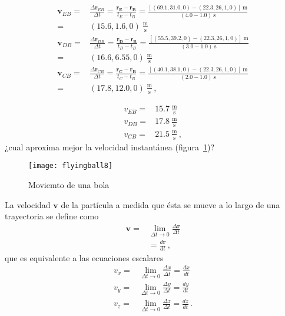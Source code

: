 \begin{align}
  \mathbf{v}_{EB}=&\frac{\Delta \mathbf{r}_{EB}}{\Delta t}
=\frac{\mathbf{\mathbf{r}_E-\mathbf{r}_B}}{t_E-t_B}=
\frac{[(69.1,31.0,0)-(22.3,26,1,0)]\ \text{m}}{(4.0-1.0)\ \text{s}}\nonumber\\
=&(15.6,1.6,0)\ \frac{\text{m}}{\text{s}}\nonumber\\
  \mathbf{v}_{DB}=&\frac{\Delta \mathbf{r}_{DB}}{\Delta t}
=\frac{\mathbf{\mathbf{r}_D-\mathbf{r}_B}}{t_D-t_B}=
\frac{[(55.5,39.2,0)-(22.3,26,1,0)]\ \text{m}}{(3.0-1.0)\ \text{s}}\nonumber\\
=&(16.6,6.55,0)\ \frac{\text{m}}{\text{s}}\nonumber\\
  \mathbf{v}_{CB}=&\frac{\Delta \mathbf{r}_{CB}}{\Delta t}
=\frac{\mathbf{\mathbf{r}_C-\mathbf{r}_B}}{t_C-t_B}=
\frac{[(40.1,38.1,0)-(22.3,26,1,0)]\ \text{m}}{(2.0-1.0)\ \text{s}}\nonumber\\
=&(17.8,12.0,0)\ \frac{\text{m}}{\text{s}}\,,
\end{align}

\begin{align}
  v_{EB}=&15.7\ \frac{\text{m}}{\text{s}}\nonumber\\
  v_{DB}=&17.8\ \frac{\text{m}}{\text{s}}\nonumber\\
  v_{CB}=&21.5\ \frac{\text{m}}{\text{s}}\,,
\end{align}
¿cual aproxima mejor la velocidad instantánea (figura~\ref{fig:flyingball8})?

\begin{figure}
  \centering
  \texttt{[image: flyingball8]}
  \caption{Moviemto de una bola}
  \label{fig:flyingball8}
\end{figure}


La velocidad $\mathbf{v}$ de la partícula a medida que ésta se mueve a lo largo de una trayectoria se define como
\begin{align}
  \mathbf{v}=&\lim_{\Delta t\to0}\frac{\Delta\mathbf{r}}{\Delta t}\nonumber\\
  &=\frac{d\mathbf{r}}{dt}\,,
\end{align}
que es equivalente a las ecuaciones escalares
\begin{align}
  v_x=&\lim_{\Delta t\to0}\frac{\Delta x}{\Delta t}=\frac{dx}{dt}\nonumber\\
  v_y=&\lim_{\Delta t\to0}\frac{\Delta y}{\Delta t}=\frac{dy}{dt}\nonumber\\
  v_z=&\lim_{\Delta t\to0}\frac{\Delta z}{\Delta t}=\frac{dz}{dt}\,.
\end{align}

